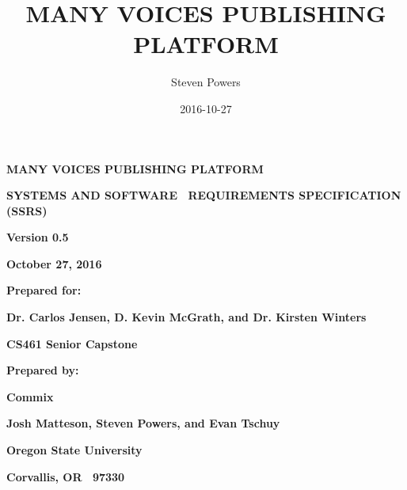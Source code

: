 \documentclass[letterpaper, 10pt, draftclsnofoot, compsoc, onecolumn]{IEEEtran}
\title{MANY VOICES PUBLISHING PLATFORM}
\author{Steven Powers}
\date{2016-10-27}
\begin{document}
\clearpage\setcounter{page}{1}%
\thispagestyle{FirstPage}


\bigskip


\bigskip

\clearpage

{\centering\bfseries\color{black}\huge
MANY VOICES PUBLISHING PLATFORM
\par}


\bigskip

\bigskip


{\centering\bfseries\color{black}\Large
SYSTEMS AND SOFTWARE \ REQUIREMENTS SPECIFICATION (SSRS)
\par}


\bigskip


\bigskip


\bigskip


\bigskip


\bigskip

{\centering\bfseries\color{black}
Version 0.5
\par}

{\centering\bfseries\color{black}
October 27, 2016
\par}


\bigskip


\bigskip

{\centering\bfseries\color{black}
Prepared for:
\par}

{\centering\bfseries\color{black}
Dr. Carlos Jensen, D. Kevin McGrath, and Dr. Kirsten Winters
\par}

{\centering\bfseries\color{black}
CS461 Senior Capstone
\par}


\bigskip


\bigskip

{\centering\bfseries\color{black}
Prepared by:
\par}

{\centering\bfseries\color{black}
Commix
\par}

{\centering\bfseries\color{black}
Josh Matteson, Steven Powers, and Evan Tschuy
\par}

{\centering\bfseries\color{black}
Oregon State University
\par}

{\centering\bfseries\color{black}
Corvallis, OR \ 97330
\par}
\end{document}
